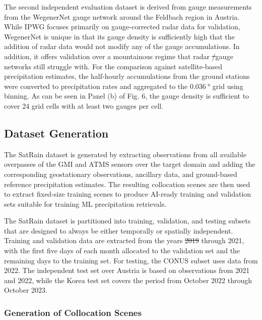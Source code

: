 \documentclass[11pt]{article}
\providecommand{\DIFadd}[1]{{\protect\color{blue}\uwave{#1}}} %
\providecommand{\DIFdel}[1]{{\protect\color{red}\sout{#1}}}                      %
\providecommand{\DIFaddbegin}{} %
\providecommand{\DIFaddend}{} %
\providecommand{\DIFdelbegin}{} %
\providecommand{\DIFdelend}{} %
\begin{document}
The second independent evaluation dataset is derived from gauge measurements
from the WegenerNet \citep{Fuchsberger2021WegenerNet} gauge network around the
Feldbach region in Austria. While IPWG focuses primarily on gauge-corrected
radar data for validation, WegenerNet is unique in that its gauge density is
sufficiently high that the addition of radar data would not modify any of the
gauge accumulations. In addition, it offers validation over a mountainous regime
that radar \DIFdelbegin \DIFdel{/}\DIFdelend \DIFaddbegin \DIFadd{and }\DIFaddend gauge networks still struggle with. For the comparison against
satellite-based precipitation estimates, the half-hourly accumulations from the
ground stations were converted to precipitation rates and aggregated to the
$\SI{0.036}{\degree}$ grid using binning. As can be seen in Panel (b) of Fig. 6,
the gauge density is sufficient to cover 24 grid cells with at least two gauges
per cell.


\subsection{Dataset Generation}

The SatRain dataset is generated by extracting observations from all available
overpasses of the GMI and ATMS sensors over the target domain and adding the
corresponding geostationary observations, ancillary data, and ground-based
reference precipitation estimates. The resulting collocation scenes are then
used to extract fixed-size training scenes to produce AI-ready training and
validation sets suitable for training ML precipitation retrievals.

The SatRain dataset is partitioned into training, validation, and testing
subsets that are designed to always be either temporally or spatially
independent. Training and validation data are extracted from the years \DIFdelbegin \DIFdel{2019
}\DIFdelend \DIFaddbegin \DIFadd{2018
}\DIFaddend through 2021, with the first five days of each month allocated to the validation
set and the remaining days to the training set. For testing, the CONUS subset
uses data from 2022. The independent test set over Austria is based on
observations from 2021 and 2022, while the Korea test set covers the period from
October 2022 through October 2023.

\subsubsection{Generation of Collocation Scenes}
\end{document}
